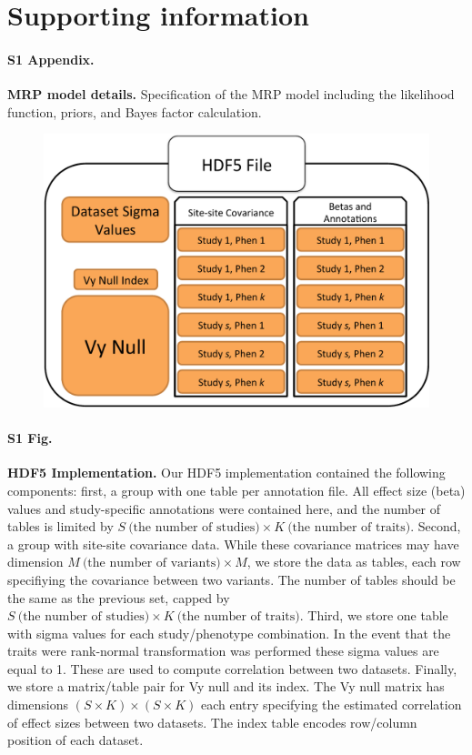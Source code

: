 \section*{Supporting information}


\paragraph*{S1 Appendix.}
\label{S1_Appendix}
{\bf MRP model details.} Specification of the MRP model including the likelihood function, priors, and Bayes factor calculation.

\begin{figure}[H]
\includegraphics[width=\textwidth]{../figures/Figure_S01.pdf}
\end{figure}
\paragraph*{S1 Fig.}
\label{hdf5_fig}
{\bf HDF5 Implementation.} Our HDF5 implementation contained the following components: first, a group with one table per annotation file. All effect size (beta) values and study-specific annotations were contained here, and the number of tables is limited by $S\ \textrm{(the number of studies)} \times K\ \textrm{(the number of traits)}$. Second, a group with site-site covariance data. While these covariance matrices may have dimension $M\ \textrm{(the number of variants)} \times M$, we store the data as tables, each row specifiying the covariance between two variants. The number of tables should be the same as the previous set, capped by $S\ \textrm{(the number of studies)} \times K\ \textrm{(the number of traits)}$. Third, we store one table with sigma values for each study/phenotype combination. In the event that the traits were rank-normal transformation was performed these sigma values are equal to 1. These are used to compute correlation between two datasets. Finally, we store a matrix/table pair for Vy null and its index. The Vy null matrix has dimensions $ (S \times K) \times (S \times K)$ each entry specifying the estimated correlation of effect sizes between two datasets. The index table encodes row/column position of each dataset.

